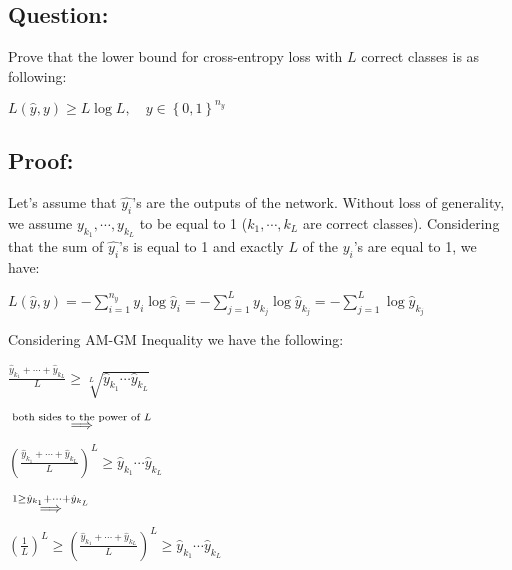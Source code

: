 \documentclass{article}
\begin{document}
\begin{latin}
\subsection{Question:}
Prove that the lower bound for cross-entropy loss with $L$ correct classes is as following: \\
\begin{center}
$
L\left( \hat{y}, y \right) \ge L \log L, \quad y \in \left\{ 0, 1 \right\} ^ {n_y}
$
\end{center}
\subsection{Proof:}
Let's assume that $\hat{y_i}$'s are the outputs of the network. Without loss of generality, we assume $y_{k_1}, \cdots , y_{k_L}$ to be equal to 1 ($k_1, \cdots , k_L$ are correct classes). Considering that the sum of $\hat{y_i}$'s is equal to 1 and exactly $L$ of the $y_i$'s are equal to 1, we have:\\
\begin{center}
$
L\left( \hat{y}, y \right) = -\sum_{i = 1}^{n_y} y_i \log \hat{y}_i = -\sum_{j = 1}^{L} y_{k_j} \log \hat{y}_{k_j} = -\sum_{j = 1}^{L} \log \hat{y}_{k_j}
$
\end{center}
Considering AM-GM Inequality we have the following:\\
\begin{center}
$
\frac{\hat{y}_{k_1} + \cdots + \hat{y}_{k_L}}{L} \ge \sqrt[L]{\hat{y}_{k_1}\cdots\hat{y}_{k_L}}
$
\end{center}
$
\\ \\ \overset{\text{both sides to the power of $L$} }{\Longrightarrow} \\ \\
$
\begin{center}
$
\left( \frac{\hat{y}_{k_1} + \cdots + \hat{y}_{k_L}}{L} \right) ^ {L} \ge \hat{y}_{k_1}\cdots\hat{y}_{k_L}
$
\end{center}
$
\\ \\ \overset{1 \ge \hat{y}_{k_1} + \cdots + \hat{y}_{k_L}}{\Longrightarrow} \\ \\
$
\begin{center}
$
\left( \frac{1}{L} \right) ^ {L} \ge \left( \frac{\hat{y}_{k_1} + \cdots + \hat{y}_{k_L}}{L} \right) ^ {L} \ge \hat{y}_{k_1}\cdots\hat{y}_{k_L}
$
\end{center}

\end{latin}
\end{document}
